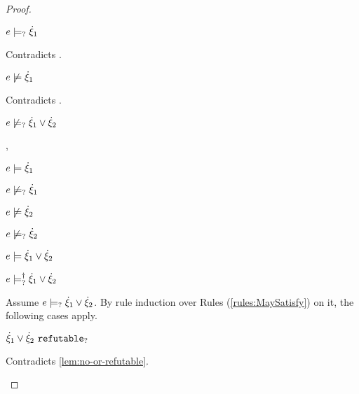 \begin{proof}
\begin{byCases}
\begin{byCases}
\begin{byCases}
\begin{pfsteps*}
            \item $e \models_{?} \dot{\xi}_1$ 
            \end{pfsteps*}
            Contradicts .
        \item[\text{(\ref{rule:CMSOr2})}]
            \begin{pfsteps*}
            \item $e \not\models \dot{\xi}_1$ 
            \end{pfsteps*}
            Contradicts .
        \end{byCases}
        \begin{pfsteps*}
        \item $e \not\models_{?} \dot{\xi}_1 \vee \dot{\xi}_2$ 
        \end{pfsteps*}
    \item[\csatisfy{e}{\hxi_1},\cnotsatisfyormay{e}{\hxi_2}]
        \begin{pfsteps*}
        \item $e \models \dot{\xi}_1$  
        \item $e \not\models_{?} \dot{\xi}_1$  
        \item $e \not\models \dot{\xi}_2$  
        \item $e \not\models_{?} \dot{\xi}_2$  
        \item $e \models \dot{\xi}_1 \vee \dot{\xi}_2$  
        \item $e \models_{?}^{\dag} \dot{\xi}_1 \vee \dot{\xi}_2$ 
        \end{pfsteps*}
        Assume $e \models_{?} \dot{\xi}_1 \vee \dot{\xi}_2$. By rule induction over Rules (\ref{rules:MaySatisfy}) on it, the following cases apply.
        \begin{byCases}
        \item[\text{(\ref{rule:CMSNotIntro})}]
            \begin{pfsteps*}
            \item $\dot{\xi}_1 \vee \dot{\xi}_2 ~\mathtt{refutable}_?$ 
            \end{pfsteps*}
            Contradicts \autoref{lem:no-or-refutable}.

\end{byCases}
\end{byCases}
\end{byCases}
\end{proof}
